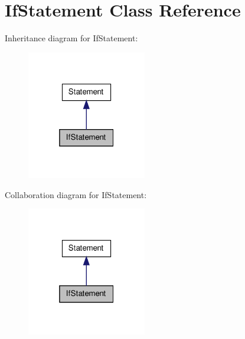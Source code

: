 \hypertarget{class_if_statement}{\section{If\-Statement Class Reference}
\label{class_if_statement}
}


Inheritance diagram for If\-Statement\-:
\nopagebreak
\begin{figure}[H]
\begin{center}
\leavevmode
\includegraphics[width=148pt]{class_if_statement__inherit__graph}
\end{center}
\end{figure}


Collaboration diagram for If\-Statement\-:
\nopagebreak
\begin{figure}[H]
\begin{center}
\leavevmode
\includegraphics[width=148pt]{class_if_statement__coll__graph}
\end{center}
\end{figure}
